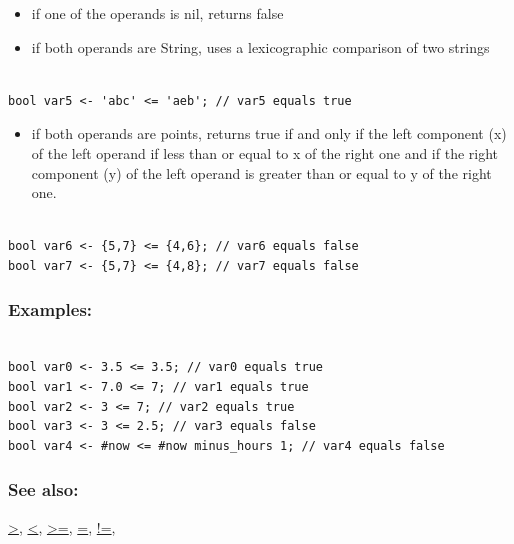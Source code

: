 \documentclass[]{book}
\providecommand{\tightlist}{%
  \setlength{\itemsep}{0pt}\setlength{\parskip}{0pt}}
\theoremstyle{definition}
\theoremstyle{definition}
\theoremstyle{definition}
\theoremstyle{remark}
\begin{document}
\begin{itemize}
\tightlist
\item
  if one of the operands is nil, returns false\\
\item
  if both operands are String, uses a lexicographic comparison of two
  strings
\end{itemize}

\begin{verbatim}
 
bool var5 <- 'abc' <= 'aeb'; // var5 equals true
\end{verbatim}

\begin{itemize}
\tightlist
\item
  if both operands are points, returns true if and only if the left
  component (x) of the left operand if less than or equal to x of the
  right one and if the right component (y) of the left operand is
  greater than or equal to y of the right one.
\end{itemize}

\begin{verbatim}
 
bool var6 <- {5,7} <= {4,6}; // var6 equals false 
bool var7 <- {5,7} <= {4,8}; // var7 equals false
\end{verbatim}

\subsubsection{Examples:}\label{examples-8}

\begin{verbatim}
 
bool var0 <- 3.5 <= 3.5; // var0 equals true 
bool var1 <- 7.0 <= 7; // var1 equals true 
bool var2 <- 3 <= 7; // var2 equals true 
bool var3 <- 3 <= 2.5; // var3 equals false 
bool var4 <- #now <= #now minus_hours 1; // var4 equals false
\end{verbatim}

\subsubsection{See also:}\label{see-also-10}

\href{operators-a-to-a.html\#\%3E}{\textgreater{}},
\href{operators-a-to-a.html\#\%3C}{\textless{}},
\href{operators-a-to-a.html\#\%3E=}{\textgreater{}=},
\href{operators-a-to-a.html\#=}{=},
\href{operators-a-to-a.html\#!=}{!=},
\end{document}

